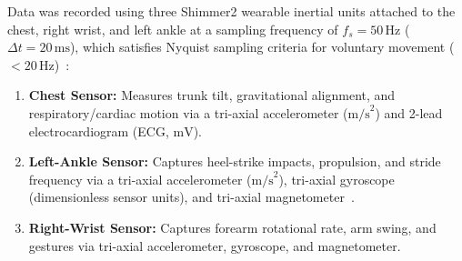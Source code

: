 \documentclass[10pt,twocolumn]{article}
\begin{document}
Data was recorded using three Shimmer2 wearable inertial units attached to the chest, right wrist, and left ankle at a sampling frequency of $f_s = 50\,\text{Hz}$ ($\Delta t = 20\,\text{ms}$), which satisfies Nyquist sampling criteria for voluntary movement ($<20\,\text{Hz}$)~\cite{bulling2014tutorial}:
\begin{enumerate}
    \item \textbf{Chest Sensor:} Measures trunk tilt, gravitational alignment, and respiratory/cardiac motion via a tri-axial accelerometer ($\text{m/s}^2$) and 2-lead electrocardiogram (ECG, $\text{mV}$).
    \item \textbf{Left-Ankle Sensor:} Captures heel-strike impacts, propulsion, and stride frequency via a tri-axial accelerometer ($\text{m/s}^2$), tri-axial gyroscope (dimensionless sensor units), and tri-axial magnetometer~\cite{atallah2011sensor}.
    \item \textbf{Right-Wrist Sensor:} Captures forearm rotational rate, arm swing, and gestures via tri-axial accelerometer, gyroscope, and magnetometer.
\end{enumerate}
\end{document}
